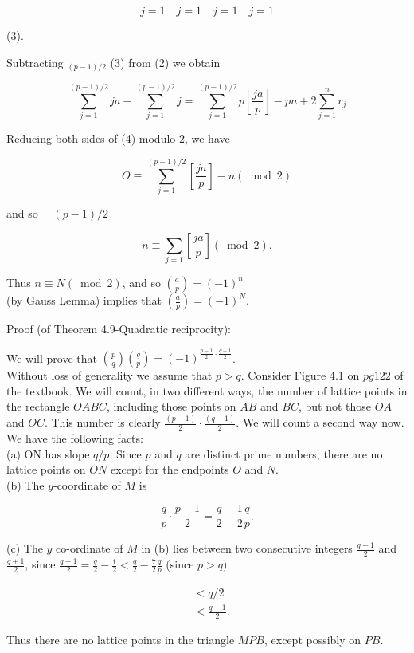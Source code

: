 \documentclass[10pt]{article}
\begin{document}
$$
j=1 \quad j=1 \quad j=1 \quad j=1
$$

(3).

Subtracting $_{(p-1) / 2}$ (3) from (2) we obtain

$$
\sum_{j=1}^{(p-1) / 2} j a-\sum_{j=1}^{(p-1) / 2} j=\sum_{j=1}^{(p-1) / 2} p\left[\frac{j a}{p}\right]-p n+2 \sum_{j=1}^{n} r_{j}
$$

Reducing both sides of (4) modulo 2, we have

$$
O \equiv \sum_{j=1}^{(p-1) / 2}\left[\frac{j a}{p}\right]-n(\bmod 2)
$$

and so $\quad(p-1) / 2$

$$
n \equiv \sum_{j=1}\left[\frac{j a}{p}\right](\bmod 2) .
$$

Thus $n \equiv N(\bmod 2)$, and so $\left(\frac{a}{p}\right)=(-1)^{n}$\\
(by Gauss Lemma) implies that $\left(\frac{a}{p}\right)=(-1)^{N}$.

Proof (of Theorem 4.9-Quadratic reciprocity):

We will prove that $\left(\frac{p}{q}\right)\left(\frac{q}{p}\right)=(-1)^{\frac{p-1}{2} \cdot \frac{q-1}{2}}$.\\
Without loss of generality we assume that $p>q$. Consider Figure 4.1 on $p g 122$ of the textbook. We will count, in two different ways, the number of lattice points in the rectangle $O A B C$, including those points on $A B$ and $B C$, but not those $O A$ and $O C$. This number is clearly $\frac{(p-1)}{2} \cdot \frac{(q-1)}{2}$. We will count a second way now. We have the following facts:\\
(a) ON has slope $q / p$. Since $p$ and $q$ are distinct prime numbers, there are no lattice points on $O N$ except for the endpoints $O$ and $N$.\\
(b) The $y$-coordinate of $M$ is

$$
\frac{q}{p} \cdot \frac{p-1}{2}=\frac{q}{2}-\frac{1}{2} \frac{q}{p} .
$$

(c) The $y$ co-ordinate of $M$ in (b) lies between two consecutive integers $\frac{q-1}{2}$ and $\frac{q+1}{2}$, since $\frac{q-1}{2}=\frac{q}{2}-\frac{1}{2}<\frac{q}{2}-\frac{7}{2} \frac{q}{p}$ (since $p>q)$

$$
\begin{aligned}
& <q / 2 \\
& <\frac{q+1}{2} .
\end{aligned}
$$

Thus there are no lattice points in the triangle $M P B$, except possibly on $P B$.
\end{document}
